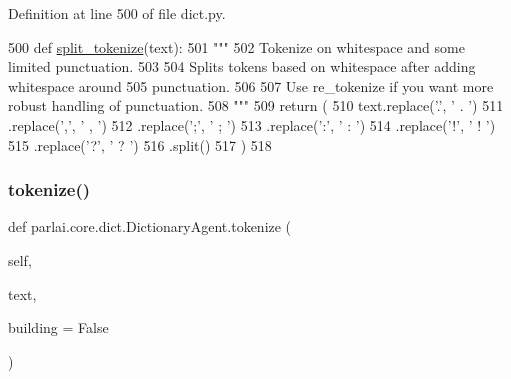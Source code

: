 Definition at line 500 of file dict.\+py.


\begin{DoxyCode}
500     \textcolor{keyword}{def }\hyperlink{namespaceparlai_1_1mturk_1_1tasks_1_1wizard__of__wikipedia_1_1worlds_a040aaf5ecfbddec14f321279454f85a8}{split\_tokenize}(text):
501         \textcolor{stringliteral}{"""}
502 \textcolor{stringliteral}{        Tokenize on whitespace and some limited punctuation.}
503 \textcolor{stringliteral}{}
504 \textcolor{stringliteral}{        Splits tokens based on whitespace after adding whitespace around}
505 \textcolor{stringliteral}{        punctuation.}
506 \textcolor{stringliteral}{}
507 \textcolor{stringliteral}{        Use re\_tokenize if you want more robust handling of punctuation.}
508 \textcolor{stringliteral}{        """}
509         \textcolor{keywordflow}{return} (
510             text.replace(\textcolor{stringliteral}{'.'}, \textcolor{stringliteral}{' . '})
511             .replace(\textcolor{stringliteral}{','}, \textcolor{stringliteral}{' , '})
512             .replace(\textcolor{stringliteral}{';'}, \textcolor{stringliteral}{' ; '})
513             .replace(\textcolor{stringliteral}{':'}, \textcolor{stringliteral}{' : '})
514             .replace(\textcolor{stringliteral}{'!'}, \textcolor{stringliteral}{' ! '})
515             .replace(\textcolor{stringliteral}{'?'}, \textcolor{stringliteral}{' ? '})
516             .split()
517         )
518 
\end{DoxyCode}
\mbox{\label{classparlai_1_1core_1_1dict_1_1DictionaryAgent_aca7e5edfd6502701277cb83b75ff4e96}} 
\subsubsection{\texorpdfstring{tokenize()}{tokenize()}}
{\footnotesize\ttfamily def parlai.\+core.\+dict.\+Dictionary\+Agent.\+tokenize (\begin{DoxyParamCaption}\item[{}]{self,  }\item[{}]{text,  }\item[{}]{building = {\ttfamily False} }\end{DoxyParamCaption})}

